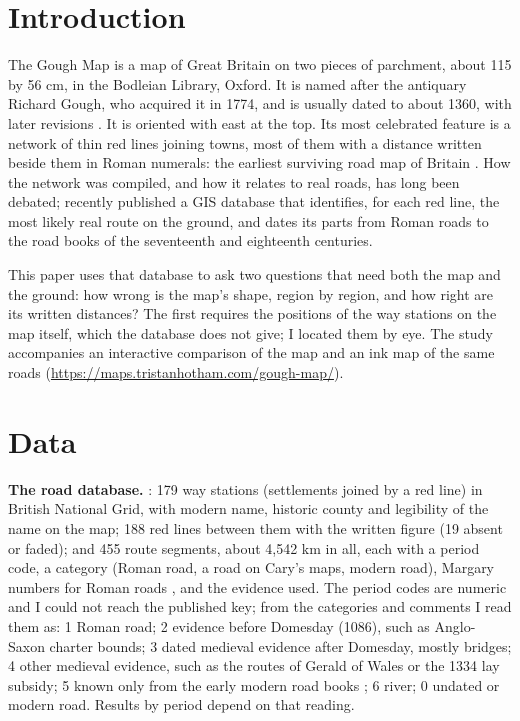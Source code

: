 \documentclass[11pt,a4paper]{article}
\begin{document}
\section{Introduction}
The Gough Map is a map of Great Britain on two pieces of parchment, about 115 by 56 cm, in the Bodleian Library, Oxford. It is named after the antiquary Richard Gough, who acquired it in 1774, and is usually dated to about 1360, with later revisions \citep{parsons,delano}. It is oriented with east at the top. Its most celebrated feature is a network of thin red lines joining towns, most of them with a distance written beside them in Roman numerals: the earliest surviving road map of Britain \citep{lilley,delano}. How the network was compiled, and how it relates to real roads, has long been debated; \citet{ads} recently published a GIS database that identifies, for each red line, the most likely real route on the ground, and dates its parts from Roman roads to the road books of the seventeenth and eighteenth centuries.

This paper uses that database to ask two questions that need both the map and the ground: how wrong is the map's shape, region by region, and how right are its written distances? The first requires the positions of the way stations on the map itself, which the database does not give; I located them by eye. The study accompanies an interactive comparison of the map and an ink map of the same roads (\url{https://maps.tristanhotham.com/gough-map/}).

\section{Data}
\textbf{The road database.} \citet{ads}: 179 way stations (settlements joined by a red line) in British National Grid, with modern name, historic county and legibility of the name on the map; 188 red lines between them with the written figure (19 absent or faded); and 455 route segments, about 4,542 km in all, each with a period code, a category (Roman road, a road on Cary's maps, modern road), Margary numbers for Roman roads \citep{margary}, and the evidence used. The period codes are numeric and I could not reach the published key; from the categories and comments I read them as: 1 Roman road; 2 evidence before Domesday (1086), such as Anglo-Saxon charter bounds; 3 dated medieval evidence after Domesday, mostly bridges; 4 other medieval evidence, such as the routes of Gerald of Wales or the 1334 lay subsidy; 5 known only from the early modern road books \citep{ogilby}; 6 river; 0 undated or modern road. Results by period depend on that reading.
\end{document}
